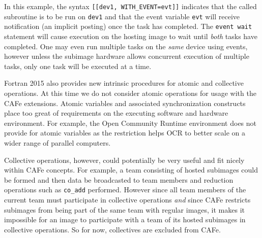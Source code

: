 In this example, the syntax \texttt{[[dev1, WITH\_EVENT=evt]]} indicates that the called
subroutine is to be run on \texttt{dev1} and that the event variable \texttt{evt} will receive
notification (an implicit posting) once the task has completed.  The \texttt{event wait}
statement will cause execution on the hosting image to wait until \emph{both} tasks have
completed.  One may even run multiple tasks on the \emph{same} device using events,
however unless the subimage hardware allows concurrent execution of multiple tasks, only
one task will be executed at a time.

Fortran 2015 also provides new intrinsic procedures for atomic and collective operations.
At this time we do not consider atomic operations for usage with the CAFe extensions.
Atomic variables and associated synchronization constructs place too great of requirements
on the executing software and hardware environment.  For example, the Open Community
Runtime environment does not provide for atomic variables as the restriction
helps OCR to better scale on a wider range of parallel computers.

Collective operations, however, could potentially be very useful and fit nicely within
CAFe concepts.  For example, a team consisting of hosted subimages could be formed and
then data be broadcasted to team members and reduction operations such as \texttt{co\_add}
performed.  However since all team members of the current team must participate in
collective operations \emph{and} since CAFe restricts subimages from being part of the
same team with regular images, it makes it impossible for an image to participate with a
team of its hosted subimages in collective operations.  So for now, collectives are
excluded from CAFe.

\begin{comment}
It is noted that these extensions to Fortran have been described in terms
explicit language syntax modifying the base language.  CAFe could equivalently have
been described in terms of compiler directives.  For example, subimage task execution could be
written as
\begin{verbatim}
 call relax(U[device]) !$OFP [[device]]
\end{verbatim}
which would allow a standard CAF compiler to compile CAFe programs.  This gives
the flavor of a domain specific language.
\end{comment}
